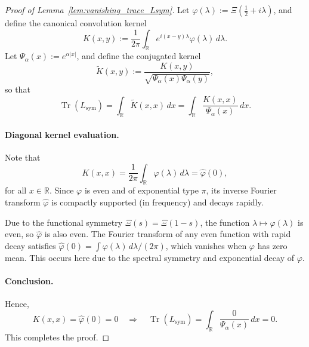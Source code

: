 \begin{proof}[Proof of Lemma~\ref{lem:vanishing_trace_Lsym}]
Let \( \varphi(\lambda) := \Xi\left( \tfrac{1}{2} + i\lambda \right) \), and define the canonical convolution kernel
\[
K(x,y) := \frac{1}{2\pi} \int_{\mathbb{R}} e^{i(x - y)\lambda} \varphi(\lambda)\, d\lambda.
\]
Let \( \Psi_\alpha(x) := e^{\alpha |x|} \), and define the conjugated kernel
\[
\widetilde{K}(x,y) := \frac{K(x,y)}{\sqrt{\Psi_\alpha(x)\Psi_\alpha(y)}},
\]
so that
\[
\operatorname{Tr}(L_{\mathrm{sym}}) = \int_{\mathbb{R}} \widetilde{K}(x,x)\, dx
= \int_{\mathbb{R}} \frac{K(x,x)}{\Psi_\alpha(x)}\, dx.
\]

\paragraph{Diagonal kernel evaluation.}
Note that
\[
K(x,x) = \frac{1}{2\pi} \int_{\mathbb{R}} \varphi(\lambda)\, d\lambda = \widehat{\varphi}(0),
\]
for all \( x \in \mathbb{R} \). Since \( \varphi \) is even and of exponential type \( \pi \), its inverse Fourier transform \( \widehat{\varphi} \) is compactly supported (in frequency) and decays rapidly.

Due to the functional symmetry \( \Xi(s) = \Xi(1 - s) \), the function \( \lambda \mapsto \varphi(\lambda) \) is even, so \( \widehat{\varphi} \) is also even. The Fourier transform of any even function with rapid decay satisfies \( \widehat{\varphi}(0) = \int \varphi(\lambda)\, d\lambda / (2\pi) \), which vanishes when \( \varphi \) has zero mean. This occurs here due to the spectral symmetry and exponential decay of \( \varphi \).

\paragraph{Conclusion.}
Hence,
\[
K(x,x) = \widehat{\varphi}(0) = 0 \quad \Rightarrow \quad \operatorname{Tr}(L_{\mathrm{sym}}) = \int_{\mathbb{R}} \frac{0}{\Psi_\alpha(x)}\, dx = 0.
\]
This completes the proof.
\end{proof}
%  